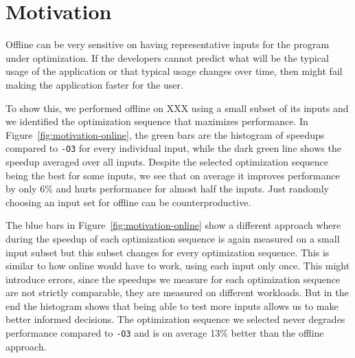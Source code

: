 \section{Motivation}

Offline \itercomp can be very sensitive on having representative inputs for the program under optimization. If the developers cannot
predict what will be the typical usage of the application or that typical usage changes over time, then \itercomp might fail making the
application faster for the user.

To show this, we performed offline \itercomp on XXX using a small subset of its inputs and we identified the optimization sequence that
maximizes performance. In Figure~\ref{fig:motivation-online}, the green bars are the histogram of speedups compared to \texttt{-O3} for
every individual input, while the dark green line shows the speedup averaged over all inputs. Despite the selected optimization sequence
being the best for some inputs, we see that on average it improves performance by only 6\% and hurts performance for almost half the
inputs. Just randomly choosing an input set for offline \itercomp can be counterproductive.

The blue bars in Figure~\ref{fig:motivation-online} show a different approach where during \itercomp the speedup of each optimization
sequence is again measured on a small input subset but this subset changes for every optimization sequence. This is similar to how online
\itercomp would have to work, using each input only once. This might introduce errors, since the speedups we measure for each optimization
sequence are not strictly comparable, they are measured on different workloads. But in the end the histogram shows that being able to test
more inputs allows us to make better informed decisions. The optimization sequence we selected never degrades performance compared to
\texttt{-O3} and is on average 13\% better than the offline approach.


